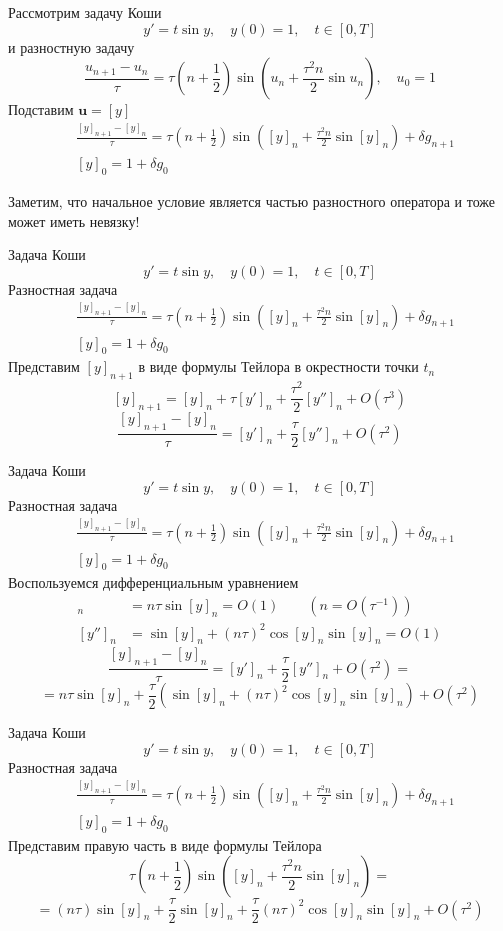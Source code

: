 \documentclass[professionalfonts,compress,unicode]{beamer}
\begin{document}
{
	Рассмотрим задачу Коши
	$$
	y' = t \sin y, \quad y(0) = 1, \quad t \in [0, T]
	$$
	и разностную задачу
	$$
	\frac{u_{n+1} - u_n}{\tau} = \tau\left(n+\frac{1}{2}\right)\sin\left(u_n + \frac{\tau^2 n}{2} 
		\sin u_n\right), \quad u_0 = 1
	$$
	Подставим $\mathbf{u} = [y]$
	\begin{align*}
	&\frac{[y]_{n+1} - [y]_n}{\tau} = \tau\left(n+\frac{1}{2}\right)\sin\left([y]_n + \frac{\tau^2 n}{2} 
		\sin [y]_n\right) + \delta g_{n+1}\\
	&[y]_0 = 1 + \delta g_0
	\end{align*}
	
	Заметим, что начальное условие является частью разностного оператора и тоже может иметь невязку!
}

{
	Задача Коши
	$$
	y' = t \sin y, \quad y(0) = 1, \quad t \in [0, T]
	$$
	Разностная задача
	\begin{align*}
	&\frac{[y]_{n+1} - [y]_n}{\tau} = \tau\left(n+\frac{1}{2}\right)\sin\left([y]_n + \frac{\tau^2 n}{2} 
		\sin [y]_n\right) + \delta g_{n+1}\\
	&[y]_0 = 1 + \delta g_0
	\end{align*}
	Представим $[y]_{n+1}$ в виде формулы Тейлора в окрестности точки $t_n$
	$$
	[y]_{n+1} = [y]_n + \tau [y']_n + \frac{\tau^2}{2} [y'']_n + O(\tau^3)
	$$
	$$
	\frac{[y]_{n+1} - [y]_n}{\tau} = [y']_n + \frac{\tau}{2} [y'']_n + O(\tau^2)
	$$
}

{
	Задача Коши
	$$
	y' = t \sin y, \quad y(0) = 1, \quad t \in [0, T]
	$$
	Разностная задача
	\begin{align*}
	&\frac{[y]_{n+1} - [y]_n}{\tau} = \tau\left(n+\frac{1}{2}\right)\sin\left([y]_n + \frac{\tau^2 n}{2} 
		\sin [y]_n\right) + \delta g_{n+1}\\
	&[y]_0 = 1 + \delta g_0
	\end{align*}
	Воспользуемся дифференциальным уравнением
	\begin{align*}
	[y']_n &= n \tau \sin [y]_n = O(1)\qquad (n = O(\tau^{-1}))\\
	[y'']_n &= \sin [y]_n + (n\tau)^2 \cos [y]_n \sin[y]_n = O(1)
	\end{align*}
	$$
	\frac{[y]_{n+1} - [y]_n}{\tau} = [y']_n + \frac{\tau}{2} [y'']_n + O(\tau^2) =
	$$
	$$
	= n\tau \sin [y]_n  + \frac{\tau}{2}\left(\sin [y]_n + (n\tau)^2 \cos [y]_n \sin[y]_n\right) + O(\tau^2)
	$$
}

{
	Задача Коши
	$$
	y' = t \sin y, \quad y(0) = 1, \quad t \in [0, T]
	$$
	Разностная задача
	\begin{align*}
	&\frac{[y]_{n+1} - [y]_n}{\tau} = \tau\left(n+\frac{1}{2}\right)\sin\left([y]_n + \frac{\tau^2 n}{2}
		\sin [y]_n\right) + \delta g_{n+1}\\
	&[y]_0 = 1 + \delta g_0
	\end{align*}
	Представим правую часть в виде формулы Тейлора
	$$
	\tau\left(n+\frac{1}{2}\right)\sin\left([y]_n + \frac{\tau^2 n}{2} \sin [y]_n\right) = 
	$$
	$$
	= (n\tau)\sin [y]_n + \frac{\tau}{2}\sin [y]_n + \frac{\tau}{2}(n\tau)^2\cos[y]_n\sin[y]_n + O(\tau^2)
	$$
}
\end{document}
